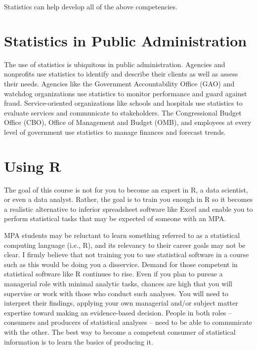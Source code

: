 \documentclass[
]{book}
\begin{document}
Statistics can help develop all of the above competencies.

\hypertarget{statistics-in-public-administration}{%
\section{Statistics in Public Administration}\label{statistics-in-public-administration}}

The use of statistics is ubiquitous in public administration. Agencies and nonprofits use statistics to identify and describe their clients as well as assess their needs. Agencies like the Government Accountability Office (GAO) and watchdog organizations use statistics to monitor performance and guard against fraud. Service-oriented organizations like schools and hospitals use statistics to evaluate services and communicate to stakeholders. The Congressional Budget Office (CBO), Office of Management and Budget (OMB), and employees at every level of government use statistics to manage finances and forecast trends.

\hypertarget{using-r}{%
\section{Using R}\label{using-r}}

The goal of this course is not for you to become an expert in R, a data scientist, or even a data analyst. Rather, the goal is to train you enough in R so it becomes a realistic alternative to inferior spreadsheet software like Excel and enable you to perform statistical tasks that may be expected of someone with an MPA.

MPA students may be reluctant to learn something referred to as a statistical computing language (i.e., R), and its relevancy to their career goals may not be clear. I firmly believe that not training you to use statistical software in a course such as this would be doing you a disservice. Demand for those competent in statistical software like R continues to rise. Even if you plan to pursue a managerial role with minimal analytic tasks, chances are high that you will supervise or work with those who conduct such analyses. You will need to interpret their findings, applying your own managerial and/or subject matter expertise toward making an evidence-based decision. People in both roles -- consumers and producers of statistical analyses -- need to be able to communicate with the other. The best way to become a competent consumer of statistical information is to learn the basics of producing it.
\end{document}
